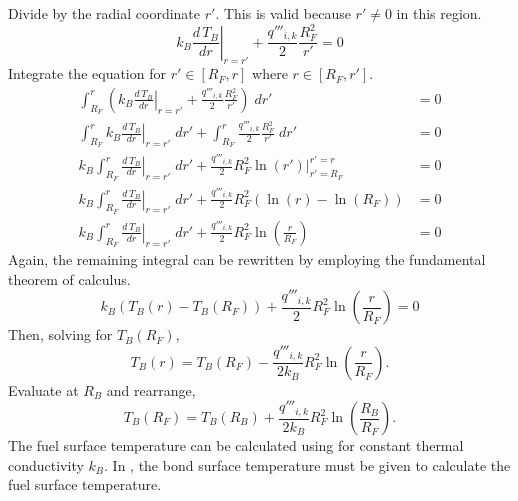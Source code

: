       Divide  by the radial coordinate $r'$. This is
      valid because $r' \ne 0$ in this region.
      \begin{equation}
        \left. k_B \frac{d\,T_B}{dr} \right|_{r=r'} + 
          \frac{q'''_{i,k}}{2} \frac{R_F^2}{r'} = 0
      \end{equation}
      Integrate the equation for $r' \in [R_F,r]$ where $r \in [R_F,r']$.
      \begin{align}
        \int_{R_F}^r \left( \left. k_B \frac{d\,T_B}{dr}\right|_{r=r'}
          + \frac{q'''_{i,k}}{2} \frac{R_F^2}{r'} \right) \; dr' &= 0 \\
        \int_{R_F}^r \left. k_B \frac{d\,T_B}{dr}\right|_{r=r'} \; dr'
          + \int_{R_F}^r \frac{q'''_{i,k}}{2} \frac{R_F^2}{r'} \; dr' &= 0\\
        k_B \int_{R_F}^r \left. \frac{d\,T_B}{dr}\right|_{r=r'} \; dr'
          + \frac{q'''_{i,k}}{2} R_F^2 \left. \ln(r') \right|_{r'=R_F}^{r'=r} 
          &= 0\\
        k_B \int_{R_F}^r \left. \frac{d\,T_B}{dr}\right|_{r=r'} \; dr'
          + \frac{q'''_{i,k}}{2} R_F^2 ( \ln(r) - \ln(R_F)) &= 0 \\
        k_B \int_{R_F}^r \left. \frac{d\,T_B}{dr}\right|_{r=r'} \; dr'
          + \frac{q'''_{i,k}}{2} R_F^2 \ln\left(\frac{r}{R_F}\right) &= 0 
      \end{align}
      Again, the remaining integral can be rewritten by employing the
      fundamental theorem of calculus.
      \begin{equation}
        \label{eq:tf_fundamental_theorem}
        k_B (T_B(r) - T_B(R_F)) + \frac{q'''_{i,k}}{2} R_F^2 
          \ln\left(\frac{r}{R_F}\right) = 0
      \end{equation}
      Then, solving for $T_B(R_F)$,
      \begin{equation}
        \label{eq:tbr}
        T_B(r) = T_B(R_F) - \frac{q'''_{i,k}}{2 k_B} R_F^2 
          \ln\left(\frac{r}{R_F}\right).
      \end{equation}
      Evaluate at $R_B$ and rearrange,
      \begin{equation}
        \label{eq:tf_forward}
        T_B(R_F) = T_B(R_B) + \frac{q'''_{i,k}}{2 k_B} R_F^2 
          \ln\left(\frac{R_B}{R_F}\right).
      \end{equation}
      The fuel surface temperature can be calculated using
       for constant thermal conductivity $k_B$.
      In , the bond surface temperature must be
      given to calculate the fuel surface temperature.

